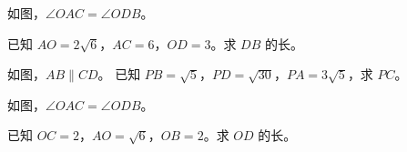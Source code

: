 \documentclass{exam-zh}
\begin{document}

\begin{problem}[points=10]
  \noindent
  \begin{minipage}[t]{\dimexpr\linewidth-60mm-6mm\relax}
    \vspace{0pt}
    如图，$\angle OAC=\angle ODB$。

已知 $AO=2\sqrt{6}$，$AC=6$，$OD=3$。求 $DB$ 的长。
    
  \end{minipage}\hfill
  \begin{diagramcoltikz}{60mm}{}
  }
  \end{diagramcoltikz}
  \par\medskip
  \answerarea[54mm]
\end{problem}



\begin{problem}[points=10]
  \noindent
  \begin{minipage}[t]{\dimexpr\linewidth-60mm-6mm\relax}
    \vspace{0pt}
    如图，$AB\parallel CD$。
已知 $PB=\sqrt{5}$，$PD=\sqrt{30}$，$PA=3\sqrt{5}$，求 $PC$。
    
  \end{minipage}\hfill
  \begin{diagramcoltikz}{60mm}{}
  }
  \end{diagramcoltikz}
  \par\medskip
  \answerarea[42mm]
\end{problem}



\begin{problem}[points=10]
  \noindent
  \begin{minipage}[t]{\dimexpr\linewidth-60mm-6mm\relax}
    \vspace{0pt}
    如图，$\angle OAC=\angle ODB$。

已知 $OC=2$，$AO=\sqrt{6}$，$OB=2$。求 $OD$ 的长。
    
  \end{minipage}\hfill
  \begin{diagramcoltikz}{60mm}{}
  }
  \end{diagramcoltikz}
  \par\medskip
  \answerarea[54mm]
\end{problem}
\end{document}
